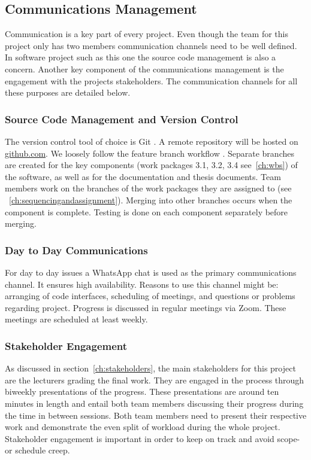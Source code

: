 \subsection{Communications Management}
\label{ch:communicationsmanagement}
Communication is a key part of every project. Even though the team for this project only has two members communication channels need to be well defined. In software project such as this one the source code management is also a concern. Another key component of the communications management is the engagement with the projects stakeholders. The communication channels for all these purposes are detailed below.

\subsubsection{Source Code Management and Version Control}
\label{ch:versioncontrol}
The version control tool of choice is Git \cite{git}. A remote repository will be hosted on \url{github.com}. We loosely follow the feature branch workflow \cite{featurebranch}. Separate branches are created for the key components (work packages 3.1, 3.2, 3.4 see~\ref{ch:wbs}) of the software, as well as for the documentation and thesis documents. Team members work on the branches of the work packages they are assigned to (see ~\ref{ch:sequencingandassignment}). Merging into other branches occurs when the component is complete. Testing is done on each component separately before merging.


\subsubsection{Day to Day Communications}
\label{ch:daytodaycomms}
For day to day issues a WhatsApp chat is used as the primary communications channel. It ensures high availability. Reasons to use this channel might be: arranging of code interfaces, scheduling of meetings, and questions or problems regarding project. Progress is discussed in regular meetings via Zoom. These meetings are scheduled at least weekly.


\subsubsection{Stakeholder Engagement}
\label{ch:stakeholerengagement}
As discussed in section~\ref{ch:stakeholders}, the main stakeholders for this project are the lecturers grading the final work. They are engaged in the process through biweekly presentations of the progress. These presentations are around ten minutes in length and entail both team members discussing their progress during the time in between sessions. Both team members need to present their respective work and demonstrate the even split of workload during the whole project. Stakeholder engagement is important in order to keep on track and avoid scope- or schedule creep.


